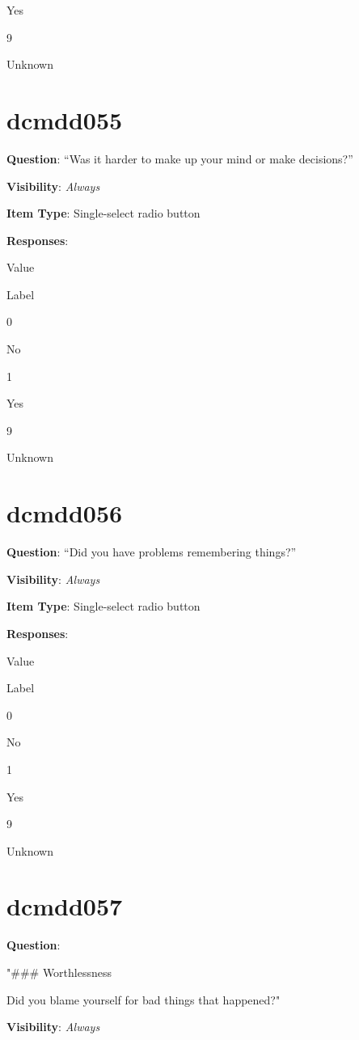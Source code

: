 \documentclass[
]{book}
\begin{document}
Yes

9

Unknown

\hypertarget{dcmdd055}{%
\section{dcmdd055}\label{dcmdd055}}

\textbf{Question}: ``Was it harder to make up your mind or make decisions?''

\textbf{Visibility}: \emph{Always}

\textbf{Item Type}: Single-select radio button

\textbf{Responses}:

Value

Label

0

No

1

Yes

9

Unknown

\hypertarget{dcmdd056}{%
\section{dcmdd056}\label{dcmdd056}}

\textbf{Question}: ``Did you have problems remembering things?''

\textbf{Visibility}: \emph{Always}

\textbf{Item Type}: Single-select radio button

\textbf{Responses}:

Value

Label

0

No

1

Yes

9

Unknown

\hypertarget{dcmdd057}{%
\section{dcmdd057}\label{dcmdd057}}

\textbf{Question}:

"\#\#\# Worthlessness

Did you blame yourself for bad things that happened?"

\textbf{Visibility}: \emph{Always}
\end{document}
